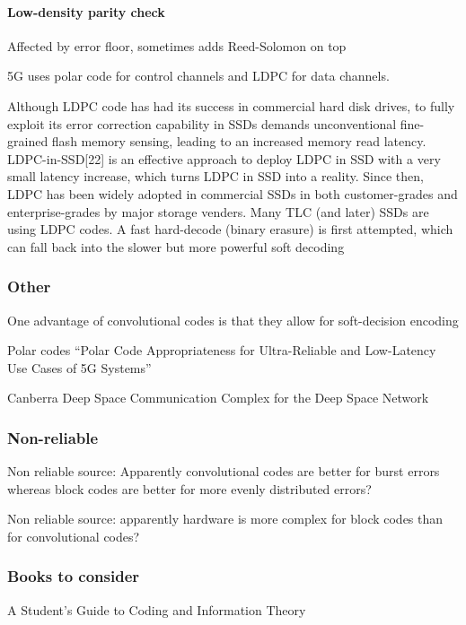 \documentclass{article}
\begin{document}
\paragraph{Low-density parity check}

Affected by error floor, sometimes adds Reed-Solomon on top

5G uses polar code for control channels and LDPC for data channels.

Although LDPC code has had its success in commercial hard disk drives, to fully exploit its error correction capability in SSDs demands unconventional fine-grained flash memory sensing, leading to an increased memory read latency. LDPC-in-SSD[22] is an effective approach to deploy LDPC in SSD with a very small latency increase, which turns LDPC in SSD into a reality. Since then, LDPC has been widely adopted in commercial SSDs in both customer-grades and enterprise-grades by major storage venders. Many TLC (and later) SSDs are using LDPC codes. A fast hard-decode (binary erasure) is first attempted, which can fall back into the slower but more powerful soft decoding

\subsubsection{Other}

One advantage of convolutional codes is that they allow for soft-decision encoding 

Polar codes “Polar Code Appropriateness for Ultra-Reliable and Low-Latency Use Cases of 5G Systems”

Canberra Deep Space Communication Complex for the Deep Space Network

\subsubsection{Non-reliable}

Non reliable source: Apparently convolutional codes are better for burst errors whereas block codes are better for more evenly distributed errors?

Non reliable source: apparently hardware is more complex for block codes than for convolutional codes?

\subsubsection{Books to consider}

A Student's Guide to Coding and Information Theory
\end{document}
